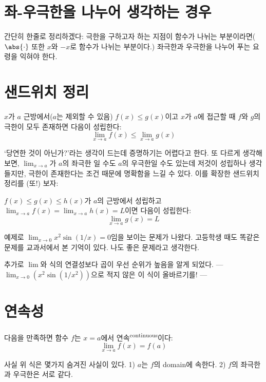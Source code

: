 \documentclass[../note.tex]{subfiles}
\begin{document}
\section{좌-우극한을 나누어 생각하는 경우}
간단히 한줄로 정리하겠다: 극한을 구하고자 하는 지점이 함수가 나뉘는 부분이라면($\abs{\cdot}$ 또한 $x$와 $-x$로 함수가 나뉘는 부분이다.) 좌극한과 우극한을 나누어 푸는 요령을 익혀야 한다.

\section{샌드위치 정리}
\begin{theorem}
  $x$가 $a$ 근방에서($a$는 제외할 수 있음) $f(x) \leq g(x)$이고 $x$가 $a$에 접근할 때 $f$와 $g$의 극한이 모두 존재하면 다음이 성립한다:
  \begin{equation}
    \lim_{x \to a} f(x) \leq \lim_{x \to a} g(x)
  \end{equation}
\end{theorem}
`당연한 것이 아닌가?'라는 생각이 드는데 증명하기는 어렵다고 한다. 또 다르게 생각해보면, $\lim_{x \to a}$가 $a$의 좌극한 일 수도 $a$의 우극한일 수도 있는데 저것이 성립하나 생각 들지만, 극한이 존재한다는 조건 때문에 명확함을 느길 수 있다. 이를 확장한 샌드위치 정리를 (또!) 보자:

\begin{theorem}[샌드위치 정리]
  $f(x) \leq g(x) \leq h(x)$가 $a$의 근방에서 성립하고 $\lim_{x \to a} f(x) = \lim_{x \to a} h(x) = L$이면 다음이 성립한다:
  \begin{equation}
    \lim_{x \to a} g(x) = L
  \end{equation}
\end{theorem}
예제로 $\lim_{x \to 0}x^{2}\sin(1/x)=0$임을 보이는 문제가 나왔다. 고등학생 때도 똑같은 문제를 교과서에서 본 기억이 있다. 나도 좋은 문제라고 생각한다.

추가로 $\lim$와 식의 연결성보다 곱이 우선 순위가 높음을 알게 되었다. --- $\lim_{x \to 0}(x^{2}\sin(1/x^2))$으로 적지 않은 이 식이 올바르기를! ---

\section{연속성}
\begin{definition}[연속]
  다음을 만족하면 함수 $f$는 $x=a$에서 연속\textsuperscript{continuous}이다:
  \begin{equation}
    \lim_{x \to a} f(x) = f(a)
  \end{equation}
\end{definition}
사실 위 식은 몇가지 숨겨진 사실이 있다. 1) $a$는 $f$의 domain에 속한다. 2) $f$의 좌극한과 우극한은 서로 같다.
\end{document}
